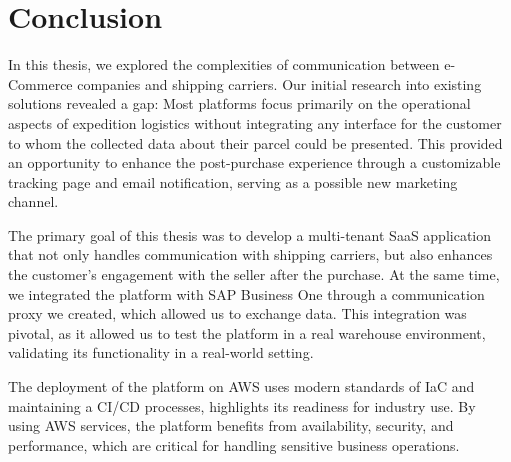 \chapter*{Conclusion}




In this thesis, we explored the complexities of communication between e-Commerce companies and shipping carriers.
Our initial research into existing solutions revealed a gap: Most platforms focus primarily on the operational aspects of expedition logistics without integrating any interface for the customer to whom the collected data about their parcel could be presented.
This provided an opportunity to enhance the post-purchase experience through a customizable tracking page and email notification, serving as a possible new marketing channel.

The primary goal of this thesis was to develop a multi-tenant \ac{SaaS} application that not only handles communication with shipping carriers, but also enhances the customer's engagement with the seller after the purchase. 
At the same time, we integrated the platform with SAP Business One through a communication proxy we created, which allowed us to exchange data.
This integration was pivotal, as it allowed us to test the platform in a real warehouse environment, validating its functionality in a real-world setting.

The deployment of the platform on \ac{AWS} uses modern standards of \ac{IaC} and maintaining a \ac{CI}/\ac{CD} processes, highlights its readiness for industry use.
By using AWS services, the platform benefits from availability, security, and performance, which are critical for handling sensitive business operations.


